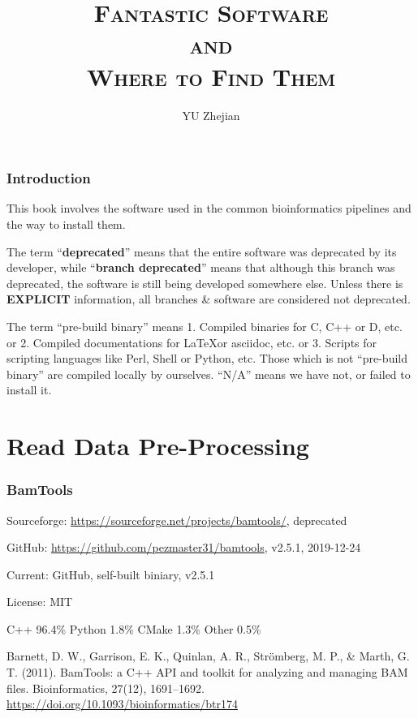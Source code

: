 \documentclass[]{article}
\begin{document}
\title{\fontsize{40}{40}\selectfont\scshape Fantastic Software\\{\Huge and}\\Where to Find Them}
\author{YU Zhejian}
\maketitle
\setcounter{section}{-1}
\section{Introduction}

This book involves the software used in the common bioinformatics pipelines and the way to install them.

The term ``\textbf{deprecated}'' means that the entire software was deprecated by its developer, while ``\textbf{branch deprecated}'' means that although this branch was deprecated, the software is still being developed somewhere else. Unless there is \textbf{EXPLICIT} information, all branches \& software are considered not deprecated.

The term ``pre-build binary'' means 1. Compiled binaries for C, C++ or D, etc. or 2. Compiled documentations for \LaTeX or asciidoc, etc. or 3. Scripts for scripting languages like Perl, Shell or Python, etc. Those which is not ``pre-build binary'' are compiled locally by ourselves. ``N/A'' means we have not, or failed to install it.

\tableofcontents

\part{Read Data Pre-Processing}

\section{BamTools}

Sourceforge: \url{https://sourceforge.net/projects/bamtools/}, deprecated

GitHub: \url{https://github.com/pezmaster31/bamtools}, v2.5.1, 2019-12-24

Current: GitHub, self-built biniary, v2.5.1

License: MIT

C++ 96.4\% Python 1.8\% CMake 1.3\% Other 0.5\%

Barnett, D. W., Garrison, E. K., Quinlan, A. R., Strömberg, M. P., \& Marth, G. T. (2011). BamTools: a C++ API and toolkit for analyzing and managing BAM files. Bioinformatics, 27(12), 1691–1692. \url{https://doi.org/10.1093/bioinformatics/btr174}
\end{document}
